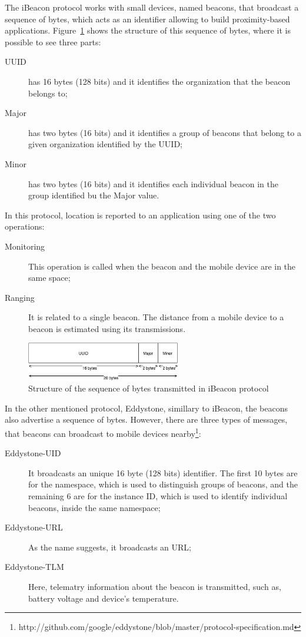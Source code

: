 The iBeacon protocol works with small devices, named beacons, that broadcast a sequence of bytes, which acts as an identifier allowing to build proximity-based applications\cite{ibeacon_book}.
Figure~\ref{fig:ibeacon_message} shows the structure of this sequence of bytes, where it is possible to see three parts:
\begin{description}
  \item[\gls{UUID}] has 16 bytes (128 bits) and it identifies the organization that the beacon belongs to;
  \item[Major] has two bytes (16 bits) and it identifies a group of beacons that belong to a given organization identified by the \gls{UUID};
  \item[Minor] has two bytes (16 bits) and it identifies each individual beacon in the group identified bu the Major value.
\end{description}
In this protocol, location is reported to an application using one of the two operations:
\begin{description}
  \item[Monitoring] This operation is called when the beacon and the mobile device are in the same space;
  \item[Ranging] It is related to a single beacon. The distance from a mobile device to a beacon is estimated using its transmissions.
\end{description}

\begin{figure}[!ht]
  \centering
    \includegraphics[width=0.6\textwidth, keepaspectratio]{images/ibeacon_message}
    \caption[iBeacon message structure]{Structure of the sequence of bytes transmitted in iBeacon protocol}
    \label{fig:ibeacon_message}
\end{figure}

In the other mentioned protocol, Eddystone, simillary to iBeacon, the beacons also advertise a sequence of bytes.
However, there are three types of messages, that beacons can broadcast to mobile devices nearby\footnote{http://github.com/google/eddystone/blob/master/protocol-specification.md}:
\begin{description}
  \item[Eddystone-UID] It broadcasts an unique 16 byte (128 bits) identifier. The first 10 bytes are for the namespace, which is used to distinguish groups of beacons, and the remaining 6 are for the instance \gls{ID}, which is used to identify individual beacons, inside the same namespace;
  \item[Eddystone-URL] As the name suggests, it broadcasts an \gls{URL};
  \item[Eddystone-TLM] Here, telematry information about the beacon is transmitted, such as, battery voltage and device's temperature.
\end{description}

